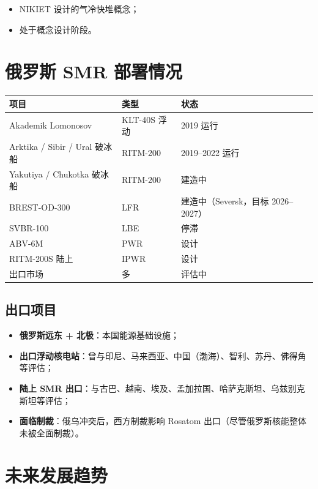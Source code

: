 \documentclass[
  UTF8,
  scheme=plain,
  fontsize=10pt,
  openany
]{ctexbook}
\begin{document}
\begin{itemize}
\tightlist
\item
  NIKIET 设计的气冷快堆概念；
\item
  处于概念设计阶段。
\end{itemize}

\section{俄罗斯 SMR
部署情况}\label{ux4fc4ux7f57ux65af-smr-ux90e8ux7f72ux60c5ux51b5}

{\def\LTcaptype{none} %
\begin{longtable}[]{@{}lll@{}}
\toprule\noalign{}
项目 & 类型 & 状态 \\
\midrule\noalign{}
\endhead
\bottomrule\noalign{}
\endlastfoot
Akademik Lomonosov & KLT-40S 浮动 & 2019 运行 \\
Arktika / Sibir / Ural 破冰船 & RITM-200 & 2019--2022 运行 \\
Yakutiya / Chukotka 破冰船 & RITM-200 & 建造中 \\
BREST-OD-300 & LFR & 建造中（Seversk，目标 2026--2027） \\
SVBR-100 & LBE & 停滞 \\
ABV-6M & PWR & 设计 \\
RITM-200S 陆上 & IPWR & 设计 \\
出口市场 & 多 & 评估中 \\
\end{longtable}
}

\subsection{出口项目}\label{ux51faux53e3ux9879ux76ee}

\begin{itemize}
\tightlist
\item
  \textbf{俄罗斯远东 + 北极}：本国能源基础设施；
\item
  \textbf{出口浮动核电站}：曾与印尼、马来西亚、中国（渤海）、智利、苏丹、佛得角等评估；
\item
  \textbf{陆上 SMR
  出口}：与古巴、越南、埃及、孟加拉国、哈萨克斯坦、乌兹别克斯坦等评估；
\item
  \textbf{面临制裁}：俄乌冲突后，西方制裁影响 Rosatom
  出口（尽管俄罗斯核能整体未被全面制裁）。
\end{itemize}

\section{未来发展趋势}\label{ux672aux6765ux53d1ux5c55ux8d8bux52bf-3}
\end{document}
